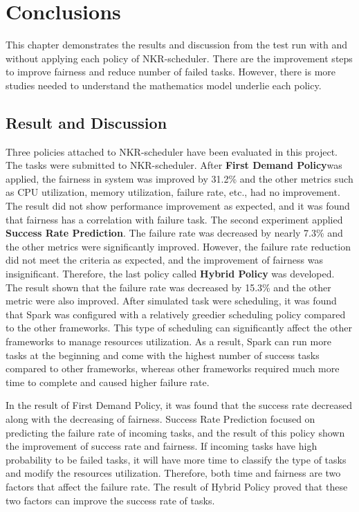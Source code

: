 \documentclass[12pt,oneside,openright,a4paper]{cpe-english-project}
\begin{document}
\chapter{Conclusions}

\hspace{10mm}This chapter demonstrates the results and discussion from the test run with and without applying each policy of NKR-scheduler. There are the improvement steps to improve fairness and reduce number of failed tasks. However, there is more studies needed to understand the mathematics model underlie each policy.

\section{Result and Discussion}
\hspace{10mm}Three policies attached to NKR-scheduler have been evaluated in this project. The tasks were submitted to NKR-scheduler. After \textbf{First Demand Policy}was applied, the fairness in system was improved by 31.2\% and the other metrics such as CPU utilization, memory utilization, failure rate, etc., had no improvement. The result did not show performance improvement as expected, and it was found that fairness has a correlation with failure task. The second experiment applied \textbf{Success Rate Prediction}. The failure rate was decreased by nearly 7.3\% and the other metrics were significantly improved. However, the failure rate reduction did not meet the criteria as expected, and the improvement of fairness was insignificant. Therefore, the last policy called \textbf{Hybrid Policy} was developed. The result shown that the failure rate was decreased by 15.3\% and the other metric were also improved. After simulated task were scheduling, it was found that Spark was configured with a relatively greedier scheduling policy compared to the other frameworks. This type of scheduling can significantly affect the other frameworks to manage resources utilization. As a result, Spark can run more tasks at the beginning and come with the highest number of success tasks compared to other frameworks, whereas other frameworks required much more time to complete and caused higher failure rate. 

\hspace{10mm}In the result of First Demand Policy, it was found that the success  rate decreased along with the decreasing of fairness. Success Rate Prediction focused on predicting the failure rate of incoming tasks, and the result of this policy shown the improvement of success rate and fairness.   If incoming tasks have high probability to be failed tasks, it will have more time to classify the type of tasks and modify the resources utilization. Therefore, both time and fairness are two factors that affect the failure rate. The result of Hybrid Policy proved that these two factors can improve the success rate of tasks.
\end{document}
